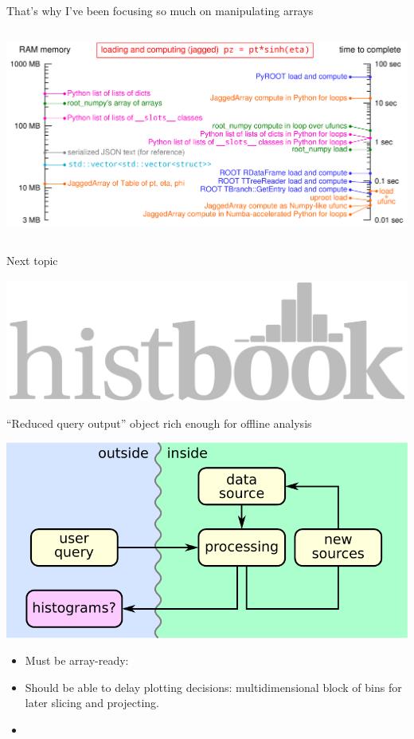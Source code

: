 \documentclass[aspectratio=169]{beamer}
\begin{document}
\begin{frame}{That's why I've been focusing so much on manipulating arrays}
\vspace{0.3 cm}
\begin{columns}
\includegraphics[width=\linewidth]{logscales.pdf}
\end{columns}
\end{frame}

\begin{frame}{Next topic}
\large
\vspace{1 cm}
\begin{center}
\includegraphics[width=0.4\linewidth]{histbook-logo.pdf}
\end{center}
\end{frame}

\begin{frame}{``Reduced query output'' object rich enough for offline analysis}
\Large
\begin{center}
\includegraphics[width=0.5\linewidth]{basic-block-diagram-2.pdf}
\end{center}

\begin{itemize}
\item Must be array-ready: 
\item Should be able to delay plotting decisions: multidimensional block of bins for later slicing and projecting.
\item 


\end{itemize}
\end{frame}
\end{document}
